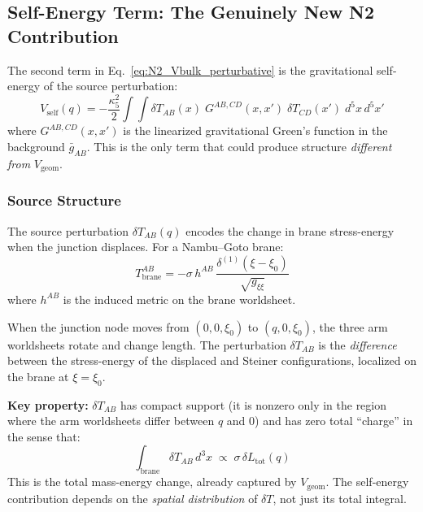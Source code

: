 \subsection{Self-Energy Term: The Genuinely New N2 Contribution}
\label{sec:N2:self}

The second term in Eq.~\eqref{eq:N2_Vbulk_perturbative} is the
gravitational self-energy of the source perturbation:
\begin{equation}
    V_{\mathrm{self}}(q) = -\frac{\kappa_5^2}{2}\int\!\!\int
    \delta T_{AB}(x)\; G^{AB,CD}(x,x')\;
    \delta T_{CD}(x')\; d^5x\, d^5x'
    \label{eq:N2_Vself}
\end{equation}
where $G^{AB,CD}(x,x')$ is the linearized gravitational Green's
function in the background $\bar{g}_{AB}$. This is the only term that
could produce structure \emph{different from} $V_{\mathrm{geom}}$.
\tagDc

\subsubsection{Source Structure}

The source perturbation $\delta T_{AB}(q)$ encodes the change in
brane stress-energy when the junction displaces. For a Nambu--Goto
brane:
\begin{equation}
    T^{AB}_{\mathrm{brane}} = -\sigma\, h^{AB}\,
    \frac{\delta^{(1)}(\xi - \xi_0)}{\sqrt{g_{\xi\xi}}}
    \label{eq:N2_Tbrane}
\end{equation}
where $h^{AB}$ is the induced metric on the brane worldsheet.

When the junction node moves from $(0,0,\xi_0)$ to $(q,0,\xi_0)$,
the three arm worldsheets rotate and change length. The perturbation
$\delta T_{AB}$ is the \emph{difference} between the stress-energy
of the displaced and Steiner configurations, localized on the brane
at $\xi = \xi_0$.

\textbf{Key property:} $\delta T_{AB}$ has compact support (it is
nonzero only in the region where the arm worldsheets differ between
$q$ and $0$) and has zero total ``charge'' in the sense that:
\begin{equation}
    \int_{\mathrm{brane}} \delta T_{AB}\, d^3x
    \;\propto\; \sigma\,\delta L_{\mathrm{tot}}(q)
    \label{eq:N2_deltaT_total}
\end{equation}
This is the total mass-energy change, already captured by $V_{\mathrm{geom}}$.
The self-energy contribution depends on the \emph{spatial distribution}
of $\delta T$, not just its total integral.

